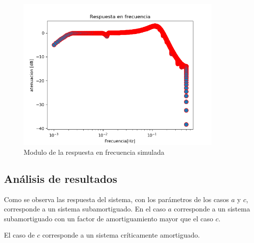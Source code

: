 \documentclass[../../guia1.tex]{subfiles}
\begin{document}
\begin{figure}[H]
  \centering
   \includegraphics[width=0.9\textwidth]{figures/rtaFrec.png}
  \caption{Modulo de la respuesta en frecuencia simulada}
  \label{fig:rtaFrecFin}
\end{figure}
\subsection{Análisis de resultados}
Como se observa las respuesta del sistema, con los parámetros de los casos $a$ y $c$, corresponde a un sistema subamortiguado. En el caso $a$ corresponde a un sistema subamortiguado con un factor de amortiguamiento mayor que el caso $c$.
\par El caso de $c$ corresponde a un sistema críticamente amortiguado.
\end{document}
